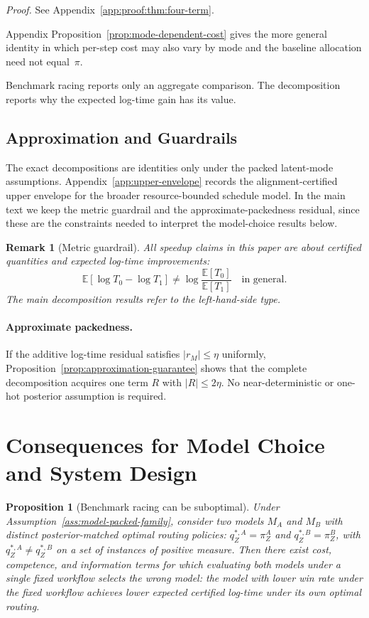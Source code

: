 \documentclass[10pt]{article}
\theoremstyle{paperplain}
\newtheorem{proposition}[theorem]{Proposition}
\theoremstyle{paperdefinition}
\theoremstyle{paperremark}
\newtheorem{remark}[theorem]{Remark}
\newcommand{\E}{\mathbb{E}}
\begin{document}
\par\noindent\emph{Proof.} See Appendix~\ref{app:proof:thm:four-term}.\par

Appendix Proposition~\ref{prop:mode-dependent-cost} gives the more general identity in which per-step cost may also vary by mode and the baseline allocation need not equal~$\pi$.


Benchmark racing reports only an aggregate comparison. The decomposition reports why the expected log-time gain has its value.

\subsection{Approximation and Guardrails}
\label{subsec:upper-envelope-thm}

The exact decompositions are identities only under the packed latent-mode assumptions. Appendix~\ref{app:upper-envelope} records the alignment-certified upper envelope for the broader resource-bounded schedule model. In the main text we keep the metric guardrail and the approximate-packedness residual, since these are the constraints needed to interpret the model-choice results below.

\begin{remark}[Metric guardrail]
All speedup claims in this paper are about certified quantities and expected log-time improvements:
\[
\E[\log T_0-\log T_1]\neq \log\frac{\E[T_0]}{\E[T_1]}
\quad\text{in general.}
\]
The main decomposition results refer to the left-hand-side type.
\end{remark}

\paragraph{Approximate packedness.}
If the additive log-time residual satisfies $|r_M|\le\eta$ uniformly, Proposition~\ref{prop:approximation-guarantee} shows that the complete decomposition acquires one term $R$ with $|R|\le2\eta$.
No near-deterministic or one-hot posterior assumption is required.


\section{Consequences for Model Choice and System Design}
\label{sec:consequences}

\begin{proposition}[Benchmark racing can be suboptimal]
\label{prop:graph-not-task}
Under Assumption~\ref{ass:model-packed-family}, consider two models $M_A$ and $M_B$ with distinct posterior-matched optimal routing policies: $q^{*,A}_Z=\pi_Z^A$ and $q^{*,B}_Z=\pi_Z^B$, with $q^{*,A}_Z \ne q^{*,B}_Z$ on a set of instances of positive measure.
Then there exist cost, competence, and information terms for which evaluating both models under a single fixed workflow selects the wrong model: the model with lower win rate under the fixed workflow achieves lower expected certified log-time under its own optimal routing.
\end{proposition}
\end{document}
